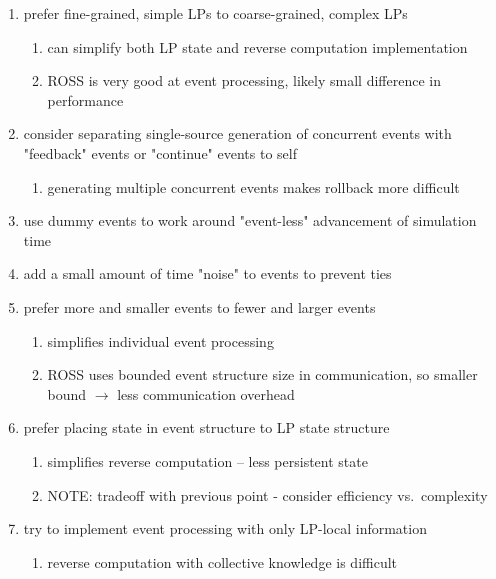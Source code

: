 \documentclass[conference,10pt,compsocconf,onecolumn]{IEEEtran}
\begin{document}
\begin{enumerate}

    \item prefer fine-grained, simple LPs to coarse-grained, complex LPs
    \begin{enumerate}
        \item can simplify both LP state and reverse computation implementation
        \item ROSS is very good at event processing, likely small difference in
            performance
    \end{enumerate}

    \item consider separating single-source generation of concurrent events with
        "feedback" events or "continue" events to self
    \begin{enumerate}
        \item generating multiple concurrent events makes rollback more difficult
    \end{enumerate}

    \item use dummy events to work around "event-less" advancement of simulation time 

    \item add a small amount of time "noise" to events to prevent ties

    \item prefer more and smaller events to fewer and larger events
    \begin{enumerate}
        \item simplifies individual event processing
        \item ROSS uses bounded event structure size in communication, so
            smaller bound $\rightarrow$  less communication overhead
    \end{enumerate}

    \item prefer placing state in event structure to LP state structure
    \begin{enumerate}
        \item simplifies reverse computation -- less persistent state
        \item NOTE: tradeoff with previous point - consider efficiency vs.\
            complexity
    \end{enumerate}

    \item try to implement event processing with only LP-local information
    \begin{enumerate}
        \item reverse computation with collective knowledge is difficult
    \end{enumerate}


\end{enumerate}
\end{document}
